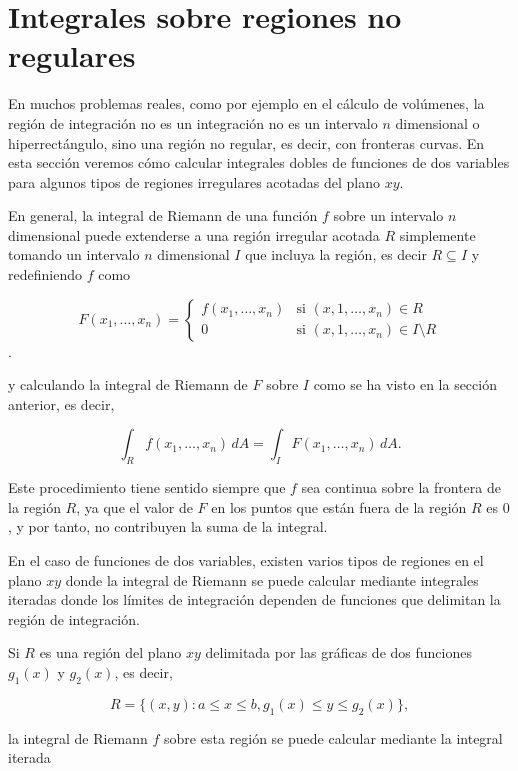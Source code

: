 \documentclass[
  a4paper,
]{scrreport}
\theoremstyle{definition}
\theoremstyle{definition}
\theoremstyle{definition}
\theoremstyle{plain}
\theoremstyle{plain}
\theoremstyle{plain}
\theoremstyle{remark}
\begin{document}
\section{Integrales sobre regiones no
regulares}\label{integrales-sobre-regiones-no-regulares}

En muchos problemas reales, como por ejemplo en el cálculo de volúmenes,
la región de integración no es un integración no es un intervalo \(n\)
dimensional o hiperrectángulo, sino una región no regular, es decir, con
fronteras curvas. En esta sección veremos cómo calcular integrales
dobles de funciones de dos variables para algunos tipos de regiones
irregulares acotadas del plano \(xy\).

En general, la integral de Riemann de una función \(f\) sobre un
intervalo \(n\) dimensional puede extenderse a una región irregular
acotada \(R\) simplemente tomando un intervalo \(n\) dimensional \(I\)
que incluya la región, es decir \(R\subseteq I\) y redefiniendo \(f\)
como

\[
F(x_1,\ldots,x_n) =
\begin{cases}
f(x_1,\ldots,x_n) & \mbox{si $(x,1,\ldots,x_n)\in R$}\\
0 & \mbox{si $(x,1,\ldots,x_n)\in I\setminus R$}
\end{cases}
\].

y calculando la integral de Riemann de \(F\) sobre \(I\) como se ha
visto en la sección anterior, es decir,

\[
\int_{R} f(x_1,\ldots,x_n)\,dA 
= \int_{I} F(x_1,\ldots,x_n)\,dA. 
\]

Este procedimiento tiene sentido siempre que \(f\) sea continua sobre la
frontera de la región \(R\), ya que el valor de \(F\) en los puntos que
están fuera de la región \(R\) es \(0\), y por tanto, no contribuyen la
suma de la integral.

En el caso de funciones de dos variables, existen varios tipos de
regiones en el plano \(xy\) donde la integral de Riemann se puede
calcular mediante integrales iteradas donde los límites de integración
dependen de funciones que delimitan la región de integración.

Si \(R\) es una región del plano \(xy\) delimitada por las gráficas de
dos funciones \(g_1(x)\) y \(g_2(x)\), es decir,

\[
R = \{(x,y): a\leq x \leq b, g_1(x)\leq y \leq g_2(x)\},
\]

la integral de Riemann \(f\) sobre esta región se puede calcular
mediante la integral iterada
\end{document}
